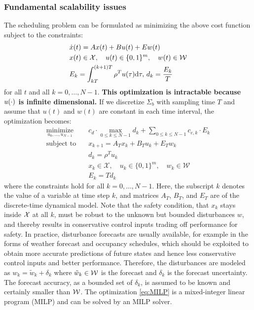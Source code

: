\subsubsection{Fundamental scalability issues}
The %
scheduling problem can be formulated as minimizing the above cost function subject to the constraints:
\begin{align*}
  & \dot{x} (t) = Ax (t) + Bu (t) + Ew (t)\\%
  & x (t) \in \mathcal{X}, \quad u(t) \in \{0,1\}^{m}, \quad w (t) \in \mathcal{W}\\%
  & E_k = \int_{kT}^{(k + 1) T} \rho^T u (\tau) \mathd \tau, \, d_k = \frac{E_k}{T}%
\end{align*}
 for all $t$ and all $k = 0, \ldots, N - 1$.
\textbf{This optimization is intractable because $u (\cdot)$ is infinite
dimensional.}
If we discretize $\Sigma_b$ with sampling time $T$ and assume that $u (t)$ and $w (t)$ are constant in each time interval, the optimization becomes:
\begin{align}
  \operatorname*{minimize}_{u_{0}, \ldots, u_{N - 1}} \quad & c_d \cdot \max_{0
  \leqslant k \leqslant N - 1} d_k + \textstyle\sum_{0 \leqslant k \leqslant N - 1}
  c_{e, k} \cdot E_k  \label{eq:MILP}\\
  \text{subject to} \quad & x_{k+1} = A_{T} x_{k} + B_{T} u_{k} + E_{T} w_{k}  \nonumber\\
  & d_k = \rho^T u_{k} \nonumber\\
  & x_{k} \in \mathcal{X}, \quad u_{k} \in \{0,1\}^{m}, \quad w_{k} \in \mathcal{W} \nonumber\\
  & E_k = T d_k \nonumber
\end{align}
where the constraints hold for all $k = 0, \ldots, N - 1$.
Here, the subscript $k$ denotes the value of a variable at time step $k$, and matrices $A_{T}$, $B_{T}$, and $E_{T}$ are of the discrete-time dynamical model.
Note that the safety condition, that $x_k$ stays inside $\mathcal{X}$ at all $k$, must be robust to the unknown but bounded disturbances $w$, and thereby results in conservative control inputs trading off performance for safety.
In practice, disturbance forecasts are usually available, for example in the forms of weather forecast and occupancy schedules, which should be exploited to obtain more accurate predictions of future states and hence less conservative control inputs and better performance.
Therefore, the disturbances are modeled as $w_{k} = \tilde{w}_{k} + \delta_{k}$ where $\tilde{w}_{k} \in \mathcal{W}$ is the forecast and $\delta_{k}$ is the forecast uncertainty.
The forecast accuracy, as a bounded set of $\delta_{k}$, is assumed to be known and certainly smaller than $\mathcal{W}$.
The optimization \eqref{eq:MILP} is a mixed-integer linear program (MILP) and can be solved by an MILP solver.

